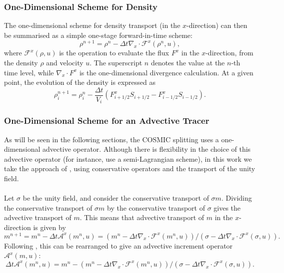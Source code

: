 \documentclass{ametsocV6.1}
\begin{document}
\subsubsection{One-Dimensional Scheme for Density} \label{sec:1d_density}
The one-dimensional scheme for density transport (in the $x$-direction) can then be summarised as a simple one-stage forward-in-time scheme:
\begin{equation}
\rho^{n+1} = \rho^n - \Delta t \nabla_x\cdot \mathcal{F}^x(\rho^n,u),
\end{equation}
where $\mathcal{F}^x(\rho,u)$ is the operation to evaluate the flux $F^x$ in the $x$-direction, from the density $\rho$ and velocity $u$.
The superscript $n$ denotes the value at the $n$-th time level, while $\nabla_x\cdot F^x$ is the one-dimensional divergence calculation.
At a given point, the evolution of the density is expressed as
\begin{equation}
\rho_i^{n+1} = \rho^n_i - \frac{\Delta t}{V_i} \left(F^x_{i+1/2}S_{i+1/2} - F^x_{i-1/2}S_{i-1/2}\right).\end{equation}


\subsubsection{One-Dimensional Scheme for an Advective Tracer} \label{sec:1d_advect}

As will be seen in the following sections, the COSMIC splitting uses a one-dimensional advective operator.
Although there is flexibility in the choice of this advective operator (for instance, \citet{lin1996ffsl} use a semi-Lagrangian scheme), in this work we take the approach of \citet{putman2007fvtransport}, using conservative operators and the transport of the unity field. \\
\\
Let $\sigma$ be the unity field, and consider the conservative transport of $\sigma m$.
Dividing the conservative transport of $\sigma m$ by the conservative transport of $\sigma$ gives the advective transport of $m$.
This means that advective transport of $m$ in the $x$-direction is given by
\begin{equation} \label{eqn:one_d_advection_tracer_2}
m^{n+1} = m^{n} - \Delta{t} \mathcal{A}^x(m^n,u) = \left( m^n - \Delta{t} \nabla_x\cdot \mathcal{F}^x(m^n,u)\right)/\left( \sigma - \Delta{t} \nabla_x\cdot \mathcal{F}^x(\sigma,u)\right).
\end{equation}
Following \citet{putman2007fvtransport}, this can be rearranged to give an advective increment operator $\mathcal{A}^x(m,u)$:
\begin{equation}
    \Delta{t} \mathcal{A}^x(m^n, u) = m^n - \left( m^n - \Delta{t} \nabla_x\cdot \mathcal{F}^x(m^n,u)\right)/\left( \sigma - \Delta{t} \nabla_x\cdot \mathcal{F}^x(\sigma,u)\right).
\end{equation} \\
\end{document}
